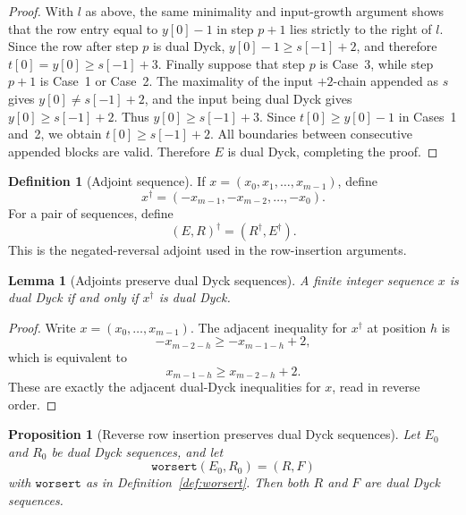 \documentclass[11pt]{article}
\theoremstyle{plain}
\newtheorem{lemma}[theorem]{Lemma}
\newtheorem{proposition}[theorem]{Proposition}
\theoremstyle{definition}
\newtheorem{definition}[theorem]{Definition}
\theoremstyle{remark}
\newcommand{\worsert}{\texttt{worsert}}
\begin{document}
\begin{proof}
With \(l\) as above, the same minimality and input-growth argument shows that
the row entry equal to \(y[0]-1\) in step \(p+1\) lies strictly to the right of
\(l\).  Since the row after step \(p\) is dual Dyck, \(y[0]-1\ge s[-1]+2\), and
therefore \(t[0]=y[0]\ge s[-1]+3\).
Finally suppose that step \(p\) is Case~3, while step \(p+1\) is Case~1 or
Case~2.  The maximality of the input \(+2\)-chain appended as \(s\) gives
\(y[0]\ne s[-1]+2\), and the input being dual Dyck gives \(y[0]\ge s[-1]+2\).
Thus \(y[0]\ge s[-1]+3\).  Since \(t[0]\ge y[0]-1\) in Cases~1 and~2, we obtain
\(t[0]\ge s[-1]+2\).
All boundaries between consecutive appended blocks are valid.  Therefore \(E\)
is dual Dyck, completing the proof.
\end{proof}
\begin{definition}[Adjoint sequence]
\label{def:adjoint-sequence}
If \(x=(x_0,x_1,\ldots,x_{m-1})\), define
\[
  x^\dagger=(-x_{m-1},-x_{m-2},\ldots,-x_0).
\]
For a pair of sequences, define
\[
  (E,R)^\dagger=(R^\dagger,E^\dagger).
\]
This is the negated-reversal adjoint used in the row-insertion arguments.
\end{definition}
\begin{lemma}[Adjoints preserve dual Dyck sequences]
\label{lem:adjoint-dual-dyck}
A finite integer sequence \(x\) is dual Dyck if and only if \(x^\dagger\) is
dual Dyck.
\end{lemma}
\begin{proof}
Write \(x=(x_0,\ldots,x_{m-1})\).  The adjacent inequality for \(x^\dagger\) at
position \(h\) is
\[
  -x_{m-2-h}\ge -x_{m-1-h}+2,
\]
which is equivalent to
\[
  x_{m-1-h}\ge x_{m-2-h}+2.
\]
These are exactly the adjacent dual-Dyck inequalities for \(x\), read in reverse
order.
\end{proof}
\begin{proposition}[Reverse row insertion preserves dual Dyck sequences]
\label{prop:worsert-dual-dyck}
Let \(E_0\) and \(R_0\) be dual Dyck sequences, and let
\[
  \worsert(E_0,R_0)=(R,F)
\]
with \(\worsert\) as in Definition~\ref{def:worsert}.  Then
both \(R\) and \(F\) are dual Dyck sequences.
\end{proposition}
\end{document}
